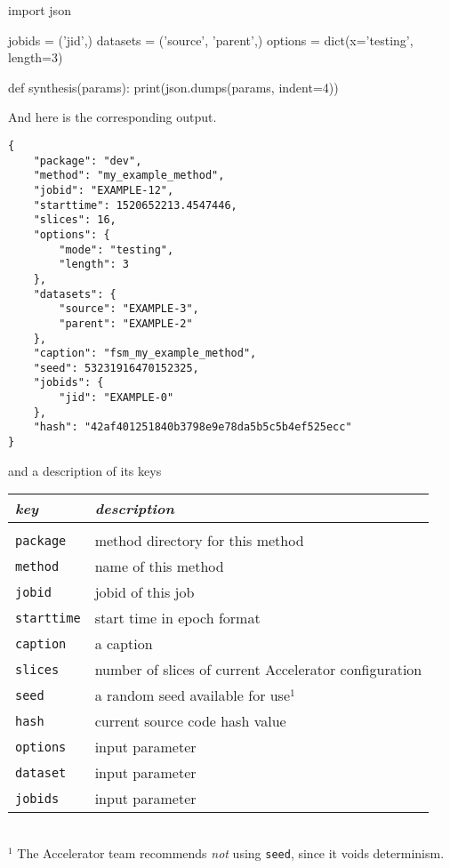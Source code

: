 \begin{python}
import json

jobids = ('jid',)
datasets = ('source', 'parent',)
options = dict(x='testing', length=3)

def synthesis(params):
    print(json.dumps(params, indent=4))
\end{python}
And here is the corresponding output.
\begin{leftbar}
\begin{verbatim}
{
    "package": "dev",
    "method": "my_example_method",
    "jobid": "EXAMPLE-12",
    "starttime": 1520652213.4547446,
    "slices": 16,
    "options": {
        "mode": "testing",
        "length": 3
    },
    "datasets": {
        "source": "EXAMPLE-3",
        "parent": "EXAMPLE-2"
    },
    "caption": "fsm_my_example_method",
    "seed": 53231916470152325,
    "jobids": {
        "jid": "EXAMPLE-0"
    },
    "hash": "42af401251840b3798e9e78da5b5c5b4ef525ecc"
}
\end{verbatim}
\end{leftbar}
and a description of its keys
\begin{snugshade}
\begin{tabular}{ll}
  \textsl{key} & \textsl{description}\\[2ex]\hline\\[1ex]
  \texttt{package} & method directory for this method\\
  \texttt{method} & name of this method\\
  \texttt{jobid} & jobid of this job\\[1ex]

  \texttt{starttime}& start time in epoch format\\
  \texttt{caption} & a caption\\
  \texttt{slices} & number of slices of current Accelerator configuration \\
  \texttt{seed} & a random seed available for use$^1$\\
  \texttt{hash} & current source code hash value\\[1ex]

  \texttt{options} & input parameter\\
  \texttt{dataset} & input parameter\\
  \texttt{jobids} &  input parameter\\[1ex] \hline
\end{tabular}\\
\small{$^1$ The Accelerator team recommends \emph{not} using
  \texttt{seed}, since it voids determinism.}
\end{snugshade}


